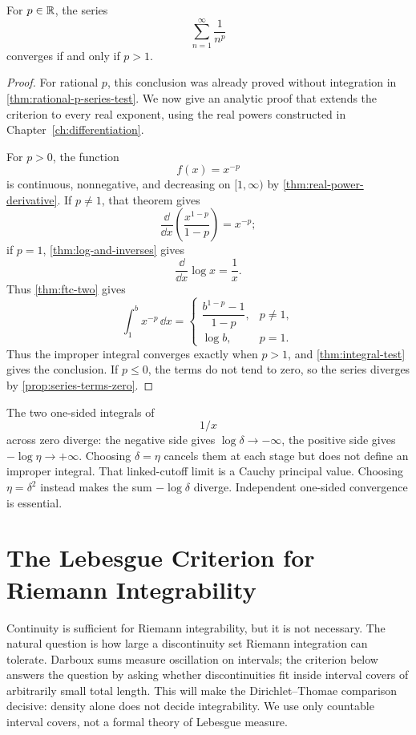 \begin{theorem}
\label{thm:p-series-test}
For $p\in\mathbb{R}$, the series
\[
\sum_{n=1}^{\infty}\frac{1}{n^p}
\]
converges if and only if $p>1$.
\end{theorem}
\begin{proof}
For rational $p$, this conclusion was already proved without integration in \cref{thm:rational-p-series-test}. We now give an analytic proof that extends the criterion to every real exponent, using the real powers constructed in Chapter~\ref{ch:differentiation}.

For $p>0$, the function
\[
f(x)=x^{-p}
\]
is continuous, nonnegative, and decreasing on $[1,\infty)$ by \cref{thm:real-power-derivative}. If $p\ne1$, that theorem gives
\[
\frac{\dd}{\dd x}\left(\frac{x^{1-p}}{1-p}\right)=x^{-p};
\]
if $p=1$, \cref{thm:log-and-inverses} gives
\[
\frac{\dd}{\dd x}\log x=\frac1x.
\]
Thus \cref{thm:ftc-two} gives
\[
\int_1^b x^{-p}\,\dd x=
\begin{cases}
\dfrac{b^{1-p}-1}{1-p},&p\ne1,\\
\log b,&p=1.
\end{cases}
\]
Thus the improper integral converges exactly when $p>1$, and \cref{thm:integral-test} gives the conclusion. If $p\leq0$, the terms do not tend to zero, so the series diverges by \cref{prop:series-terms-zero}.
\end{proof}

\begin{example}
The two one-sided integrals of
\[
1/x
\]
 across zero diverge: the negative
side gives $\log\delta\to-\infty$, the positive side gives
$-\log\eta\to+\infty$. Choosing $\delta=\eta$ cancels them at each
stage but does not define an improper integral. That linked-cutoff limit
is a Cauchy principal value. Choosing $\eta=\delta^2$ instead makes
the sum $-\log\delta$ diverge. Independent one-sided convergence is essential.
\end{example}
\section{The Lebesgue Criterion for Riemann Integrability}

Continuity is sufficient for Riemann integrability, but it is not necessary.
The natural question is how large a discontinuity set Riemann integration can
tolerate.  Darboux sums measure oscillation on intervals; the criterion below
answers the question by asking whether discontinuities fit inside interval
covers of arbitrarily small total length.  This will make the
Dirichlet--Thomae comparison decisive: density alone does not decide
integrability.  We use only countable interval covers, not a formal theory of
Lebesgue measure.

